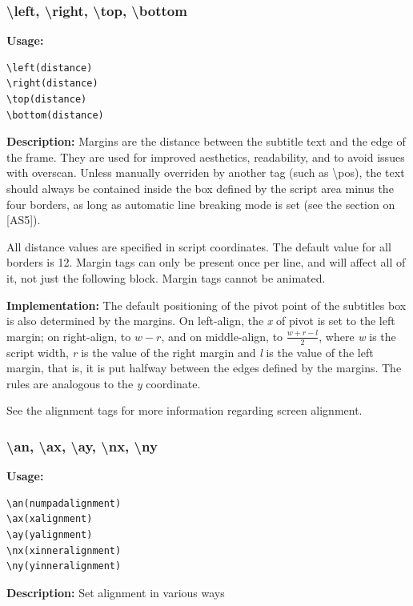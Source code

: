 \documentclass{spec}
\begin{document}
\subsubsection{\textbackslash left, \textbackslash right, \textbackslash top, \textbackslash bottom}
\textbf{Usage:}
\begin{verbatim}
\left(distance)
\right(distance)
\top(distance)
\bottom(distance)
\end{verbatim}

\textbf{Description:}
Margins are the distance between the subtitle text and the edge of the frame. They are used for
improved aesthetics, readability, and to avoid issues with overscan. Unless manually overriden
by another tag (such as \textbackslash pos), the text should always be contained inside the box
defined by the script area minus the four borders, as long as automatic line breaking mode is
set (see the section on [AS5]).

All distance values are specified in script coordinates. The default value for all borders is 12.
Margin tags can only be present once per line, and will affect all of it, not just the following
block. Margin tags cannot be animated.

\textbf{Implementation:}
The default positioning of the pivot point of the subtitles box is also determined by the margins.
On left-align, the \emph{x} of pivot is set to the left margin; on right-align, to $w - r$,
and on middle-align, to $\frac{w + r - l}{2}$, where \emph{w} is the script width, \emph{r} is
the value of the right margin and \emph{l} is the value of the left margin, that is, it is put
halfway between the edges defined by the margins. The rules are analogous to the \emph{y} coordinate.

See the alignment tags for more information regarding screen alignment.

\subsubsection{\textbackslash an, \textbackslash ax, \textbackslash ay, \textbackslash nx, \textbackslash ny}
\textbf{Usage:}
\begin{verbatim}
\an(numpadalignment)
\ax(xalignment)
\ay(yalignment)
\nx(xinneralignment)
\ny(yinneralignment)
\end{verbatim}

\textbf{Description:}
Set alignment in various ways

\end{document}
